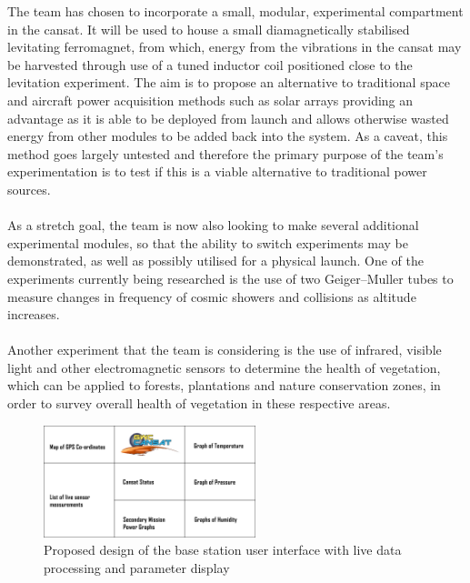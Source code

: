 \documentclass{report}
\begin{document}
		The team has chosen to incorporate a small, modular, experimental
		compartment in the cansat. It will be used to house a small diamagnetically
		stabilised levitating ferromagnet, from which, energy from the vibrations in 
		the cansat may be harvested through use of a tuned inductor coil positioned
		close to the levitation experiment. The aim is to propose an alternative to
		traditional space and aircraft power acquisition methods such as solar arrays
		providing an advantage as it is able to be deployed from launch and allows
		otherwise wasted energy from other modules to be added back into the
		system. As a caveat, this method goes largely untested and therefore the
		primary purpose of the team’s experimentation is to test if this is a viable
		alternative to traditional power sources.\\\\
\noindent
		{\color{blue}
		As a stretch goal, the team is now also looking to make several additional
		experimental modules, so that the ability to switch experiments may be 
		demonstrated, as well as possibly utilised for a physical launch. One of the 
		experiments currently being researched is the use of two 
		Geiger--Muller tubes to measure changes in frequency of cosmic showers 
		and collisions as altitude increases.
		\\\\
		Another experiment that the team is considering is the use of infrared,
		visible light and other electromagnetic sensors to determine the health of
		vegetation, which can be applied to forests, plantations and nature
		conservation
		zones, in order to survey overall health of vegetation in these respective
		areas.
		\\
		}

		
		\begin{figure}[H]
			\begin{center}
				\includegraphics[width=0.55\textwidth]{gui}
			\end{center}
			\vspace{-10pt}
			\caption{Proposed design of the base station user interface with live 
			 data processing and parameter display}
		\end{figure}
\end{document}
